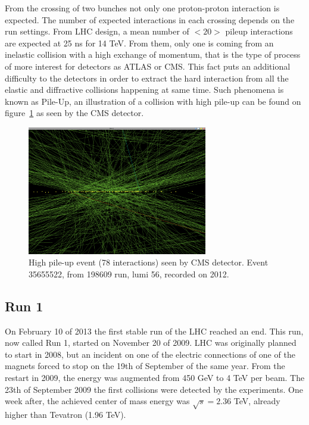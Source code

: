 From the crossing of two bunches not only one proton-proton interaction is expected. The number of expected interactions in each crossing depends on the run settings. From LHC design, a mean number of $<20>$ pileup interactions are expected at 25 ns for 14 TeV. From them, only one is coming from an inelastic collision with a high exchange of momentum, that is the type of process of more interest for detectors as ATLAS or CMS. This fact puts an additional difficulty to the detectors in order to extract the hard interaction from all the elastic and diffractive collisions happening at same time. Such phenomena is known as Pile-Up, an illustration of a collision with high pile-up can be found on figure~\ref{fig:pileup} as seen by the CMS detector.

\begin{figure}[!Hhtbp]
  \begin{center}
    \includegraphics[width=0.7\textwidth]{figs/pileup.png}
    \caption{High pile-up event (78 interactions) seen by CMS detector. Event 35655522, from 198609 run, lumi 56, recorded on 2012.}%
    \label{fig:pileup}
  \end{center}
\end{figure}

\subsection{Run 1}
\label{sec:run1}

On February 10 of 2013 the first stable run of the LHC reached an end. This run, now called Run 1, started on November 20 of 2009. LHC was originally planned to start in 2008, but an incident on one of the electric connections of one of the magnets forced to stop on the 19th of September of the same year. From the restart in 2009, the energy was augmented from 450 GeV to 4 TeV per beam. The 23th of September 2009 the first collisions were detected by the experiments. One week after, the achieved center of mass energy was $\sqrt{s}=2.36$ TeV, already higher than Tevatron (1.96 TeV).

